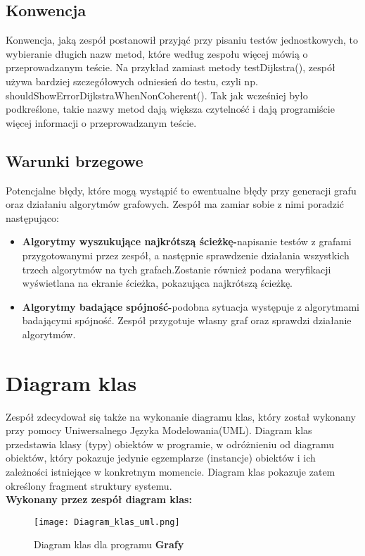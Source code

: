 \documentclass[10pt]{article}
\begin{document}
\subsection{Konwencja}
Konwencja, jaką zespół postanowił przyjąć przy pisaniu testów jednostkowych, to  wybieranie długich nazw metod, które według zespołu więcej mówią o przeprowadzanym teście. Na przykład zamiast metody testDijkstra(), zespół używa bardziej szczegółowych odniesień do testu, czyli np. shouldShowErrorDijkstraWhenNonCoherent(). Tak jak wcześniej było podkreślone, takie nazwy metod dają większa czytelność i dają programiście więcej informacji o przeprowadzanym teście.
\subsection{Warunki brzegowe}
Potencjalne błędy, które mogą wystąpić to ewentualne błędy przy generacji grafu oraz działaniu algorytmów grafowych. Zespół ma zamiar sobie z nimi poradzić następująco:
\begin{itemize}
    \item \textbf{Algorytmy wyszukujące najkrótszą ścieżkę-}napisanie testów z grafami przygotowanymi przez zespół, a następnie sprawdzenie działania wszystkich trzech algorytmów na tych grafach.Zostanie również podana weryfikacji wyświetlana na ekranie ścieżka, pokazująca najkrótszą ścieżkę.
    \item \textbf{Algorytmy badające spójność-}podobna sytuacja występuje z algorytmami badającymi spójność. Zespół przygotuje własny graf oraz sprawdzi działanie algorytmów.
\end{itemize}
\newpage
\section{Diagram klas}
Zespół zdecydował się także na wykonanie diagramu klas, który został wykonany przy pomocy Uniwersalnego Języka Modelowania(UML). Diagram klas przedstawia klasy (typy) obiektów w programie, w odróżnieniu od diagramu obiektów, który pokazuje jedynie egzemplarze (instancje) obiektów i ich zależności istniejące w konkretnym momencie. Diagram klas pokazuje zatem określony fragment struktury systemu.\\
\textbf{Wykonany przez zespół diagram klas:}
\begin{figure}[h]
\centering
\texttt{[image: Diagram\_klas\_uml.png]}
\caption{Diagram klas dla programu \textbf{Grafy}}
\end{figure}
\end{document}

